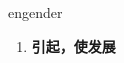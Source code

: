 
\begin{frame}
{\huge engender}
\begin{center}
\begin{enumerate}\Large
  \item \textbf{引起，使发展}
\end{enumerate}
\end{center}
\end{frame}
